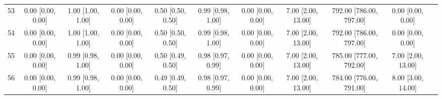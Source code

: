 \documentclass[8pt]{article}
\begin{document}
\begin{center}
\begin{footnotesize}
\begin{longtable}{|ccccccccccc|}
 53 &  0.00 [0.00, 0.00] &  1.00 [1.00, 1.00] &  0.00 [0.00, 0.00] &  0.50 [0.50, 0.50] &  0.99 [0.98, 1.00] &  0.00 [0.00, 0.00] &  7.00 [2.00, 13.00] &  792.00 [786.00, 797.00] &        0.00 [0.00, 0.00] \\
 54 &  0.00 [0.00, 0.00] &  1.00 [1.00, 1.00] &  0.00 [0.00, 0.00] &  0.50 [0.50, 0.50] &  0.99 [0.98, 1.00] &  0.00 [0.00, 0.00] &  7.00 [2.00, 13.00] &  792.00 [786.00, 797.00] &        0.00 [0.00, 0.00] \\
 55 &  0.00 [0.00, 0.00] &  0.99 [0.98, 1.00] &  0.00 [0.00, 0.00] &  0.50 [0.49, 0.50] &  0.98 [0.97, 0.99] &  0.00 [0.00, 0.00] &  7.00 [2.00, 13.00] &  785.00 [777.00, 792.00] &       7.00 [2.00, 13.00] \\
 56 &  0.00 [0.00, 0.00] &  0.99 [0.98, 1.00] &  0.00 [0.00, 0.00] &  0.49 [0.49, 0.50] &  0.98 [0.97, 0.99] &  0.00 [0.00, 0.00] &  7.00 [2.00, 13.00] &  784.00 [776.00, 791.00] &       8.00 [3.00, 14.00] \\
\end{longtable}
\end{footnotesize}
\end{center}
\end{document}
